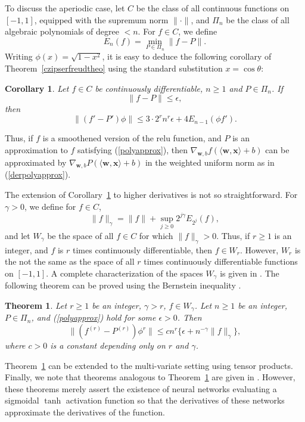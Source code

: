 \documentclass[10pt]{article}
\newcommand{\be}{\begin{equation}}
\newcommand{\ee}{\end{equation}}
\newtheorem{theorem}{Theorem}
\newtheorem{corollary}{Corollary}
\begin{document}
To discuss the aperiodic case, let $C$ be the class of all continuous functions on $[-1,1]$, equipped with the supremum norm $\|\cdot\|$, 
and $\Pi_n$ be the class of all algebraic polynomials of degree $<n$. For $f\in C$, we define
$$
E_n(f)=\min_{P\in\Pi_n}\|f-P\|.
$$
Writing $\phi(x)=\sqrt{1-x^2}$, it is easy to deduce the following corollary of Theorem~\ref{czipserfreudtheo} using the standard substitution $x=\cos \theta$:
\begin{corollary}\label{algczipserfreudcor}
Let $f\in C$ be continuously differentiable, $n\ge 1$ and $P\in \Pi_n$. If
\be\label{polyapprox}
\|f-P\|\le \epsilon,
\ee
then
\be\label{derpolyapprox}
\|(f'-P')\phi\| \le 3\cdot 2^r n^r\epsilon+4E_{n-1}(\phi f').
\ee
\end{corollary}

Thus, if $f$ is a smoothened version of the relu function, and $P$ is an approximation to $f$ satisfying (\ref{polyapprox}), then $\nabla_{\mathbf{w},b} f(\langle \mathbf{w}, \mathbf{x}\rangle +b)$ can be approximated by $\nabla_{\mathbf{w},b} P(\langle \mathbf{w}, \mathbf{x}\rangle +b)$ in the weighted uniform norm as in (\ref{derpolyapprox}). 

The extension of Corollary~\ref{algczipserfreudcor} to higher derivatives is not so straightforward.  For $\gamma>0$, we define for $f\in C$,
$$
\|f\|_\gamma =\|f\|+\sup_{j\ge 0} 2^{j\gamma}E_{2^j}(f),
$$
and let $W_\gamma$ be the space of all $f\in C$ for which $\|f\|_\gamma>0$. 
Thus, if $r\ge 1$ is an integer, and $f$ is $r$ times continuously differentiable, then $f\in W_r$. 
However, $W_r$ is the not the same as the space of all $r$ times continuously differentiable functions on $[-1,1]$. 
A complete characterization of the spaces $W_\gamma$ is given in \cite[Chapter~8, Section~7]{devlorbk}.
The following theorem can be proved using the Bernstein inequality \cite[Chapter~8, Theorem~7.6]{devlorbk}.

\begin{theorem}\label{algsimapproxtheo}
Let $r\ge 1$ be an integer, $\gamma>r$, $f\in W_\gamma$. Let $n\ge 1$ be an integer, $P\in\Pi_n$, and (\ref{polyapprox}) hold for some $\epsilon>0$. Then
\be\label{highderapprox}
\|(f^{(r)}-P^{(r)})\phi^r\| \le cn^r\{\epsilon + n^{-\gamma}\|f\|_\gamma\},
\ee
where $c>0$ is a constant depending only on $r$ and $\gamma$.
\end{theorem}

Theorem~\ref{algsimapproxtheo} can be extended to the multi-variate
setting using tensor products. Finally, we note that theorems
analogous to Theorem~\ref{algsimapproxtheo} are given in
\cite{hahm2009simultaneous}.  However, these theorems merely assert
the existence of neural networks evaluating a sigmoidal $\tanh$
activation function so that the derivatives of these networks
approximate the derivatives of the function.
\end{document}
